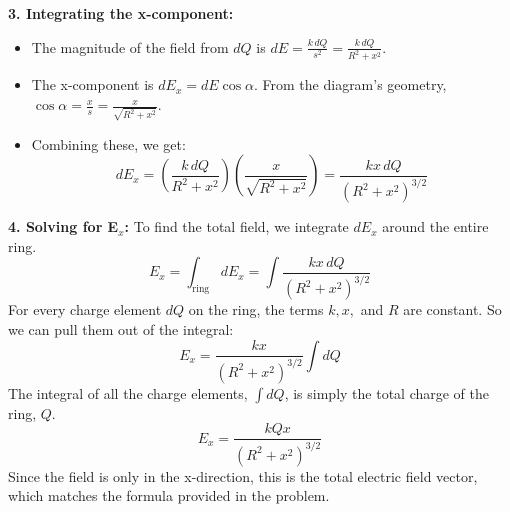 \documentclass{article}
\numberwithin{equation}{section}
\begin{document}
\textbf{3. Integrating the x-component:}
\begin{itemize}
    \item The magnitude of the field from $dQ$ is $dE = \frac{k \, dQ}{s^2} = \frac{k \, dQ}{R^2 + x^2}$.
    \item The x-component is $dE_x = dE \cos\alpha$. From the diagram's geometry, $\cos\alpha = \frac{x}{s} = \frac{x}{\sqrt{R^2+x^2}}$.
    \item Combining these, we get:
    $$ dE_x = \left( \frac{k \, dQ}{R^2 + x^2} \right) \left( \frac{x}{\sqrt{R^2+x^2}} \right) = \frac{k x \, dQ}{(R^2+x^2)^{3/2}} $$
\end{itemize}

\textbf{4. Solving for E$_x$:}
To find the total field, we integrate $dE_x$ around the entire ring.
$$ E_x = \int_{\text{ring}} dE_x = \int \frac{k x \, dQ}{(R^2+x^2)^{3/2}} $$
For every charge element $dQ$ on the ring, the terms $k, x,$ and $R$ are constant. So we can pull them out of the integral:
$$ E_x = \frac{k x}{(R^2+x^2)^{3/2}} \int dQ $$
The integral of all the charge elements, $\int dQ$, is simply the total charge of the ring, $Q$.
$$ E_x = \frac{k Q x}{(R^2+x^2)^{3/2}} $$
Since the field is only in the x-direction, this is the total electric field vector, which matches the formula provided in the problem.
\end{document}
